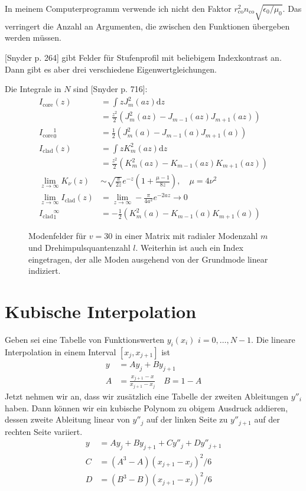 \documentclass{article}
\def\({\left(}
\def\){\right)}
\newcommand{\nco}{n_\textrm{co}}
\newcommand{\rco}{r_\textrm{co}}
\def\svgending{\ifx\pdfoutput\undefined%
  .eps_tex%
  \else%
  .pdf_tex%
  \fi}
\newcommand{\svginput}[2]{{\def\svgscale{#1}}}
\begin{document}
In meinem Computerprogramm verwende ich nicht den Faktor $\rco^2 \nco
\sqrt{\epsilon_0/\mu_0}$. Das verringert die Anzahl an Argumenten, die
zwischen den Funktionen \"ubergeben werden m\"ussen.

[Snyder p. 264] gibt Felder f\"ur Stufenprofil mit beliebigem
Indexkontrast an. Dann gibt es aber drei verschiedene
Eigenwertgleichungen.

Die Integrale in $N$ sind [Snyder p. 716]: 
\begin{align}
  I_\textrm{core}(z) &= \int z J_m^2(az) \textrm{d} z \\&= \frac{z^2}{2}(J_m^2(az)-J_{m-1}(az)J_{m+1}(az))\\
  I_\textrm{core} {}^1_0 &= \frac{1}{2}(J_m^2(a)-J_{m-1}(a)J_{m+1}(a)) \\
  I_\textrm{clad}(z) &= \int z K_m^2(az) \textrm{d} z \\&= \frac{z^2}{2}(K_m^2(az)-K_{m-1}(az)K_{m+1}(az)) \\
  \lim_{z\rightarrow \infty} K_\nu(z) &\sim \sqrt{\frac{\pi}{2z}} e^{-z}\(1+\frac{\mu-1}{8z}\), \quad \mu=4\nu^2 \\ %
  \lim_{z\rightarrow \infty} I_\textrm{clad}(z)  & = \lim_{z\rightarrow \infty} -\frac{\pi}{4a^2}e^{-2az} \rightarrow 0 \\
  I_\textrm{clad} {}^\infty_1 &= -\frac{1}{2}(K_m^2(a)-K_{m-1}(a)K_{m+1}(a)) 
\end{align}


\begin{figure}[hbtp]
  \centering
  \svginput{1}{modes}
  \caption{Modenfelder f\"ur $v=30$ in einer Matrix mit radialer
    Modenzahl $m$ und Drehimpulsquantenzahl $l$. Weiterhin ist auch
    ein Index eingetragen, der alle Moden ausgehend von der Grundmode
    linear indiziert.}
  \label{fig:fields}
\end{figure}
\section{Kubische Interpolation}
Geben sei eine Tabelle von Funktionswerten $y_i(x_i)$
$i=0,\ldots,N-1$. Die lineare Interpolation in einem Interval
$[x_j,x_{j+1}]$ ist
\begin{align}
  y &= Ay_j + By_{j+1} \\
  A &= \frac{x_{j+1}-x}{x_{j+1}-x_j}\quad B=1-A
\end{align}
Jetzt nehmen wir an, dass wir zus\"atzlich eine Tabelle der zweiten
Ableitungen $y''_i$ haben. Dann k\"onnen wir ein kubische Polynom zu
obigem Ausdruck addieren, dessen zweite Ableitung linear von $y''_j$
auf der linken Seite zu $y''_{j+1}$ auf der rechten Seite variiert.
\begin{align}
  y &= Ay_j + By_{j+1} + Cy''_j + Dy''_{j+1} \\
  C &= (A^3-A)(x_{j+1}-x_j)^2/6 \\
  D &= (B^3-B)(x_{j+1}-x_j)^2/6 
\end{align}
\end{document}
